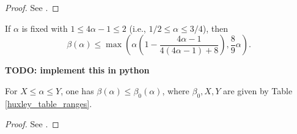 \literature
{}

\begin{proof}
See \cite[Equation~(3.18)]{bourgain_decoupling_2017}.
\end{proof}

\begin{theorem}\label{beta-hb-2020}\cite[Theorem 11.2]{demeter_small_2020}  If $\alpha$ is fixed with $1 \leq 4\alpha-1 \leq 2$ (i.e., $1/2 \leq \alpha \leq 3/4$), then
$$ \beta(\alpha) \leq \max( \alpha(1 - \frac{4\alpha-1}{4(4\alpha-1)+8}), \frac{8}{9} \alpha).$$
\end{theorem}

{\bf TODO: implement this in python}

\begin{theorem}\label{combined-bound}  For $X \leq \alpha \leq Y$, one has $\beta(\alpha) \leq \beta_0(\alpha)$, where $\beta_0, X, Y$ are given by Table \ref{huxley_table_ranges}.
\end{theorem}

\begin{proof} See \cite[Table 3]{trudgian-yang}.
\end{proof}

